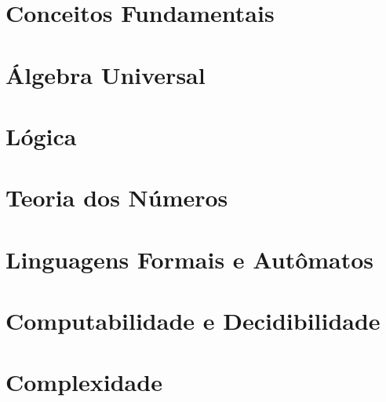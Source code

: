 \documentclass[11pt]{book}
\begin{document}




\part{Conceitos Fundamentais}




\part{Álgebra Universal}

\part{Lógica}






\part{Teoria dos Números}

\part{Linguagens Formais e Autômatos}





\part{Computabilidade e Decidibilidade}


\part{Complexidade}





\end{document}
